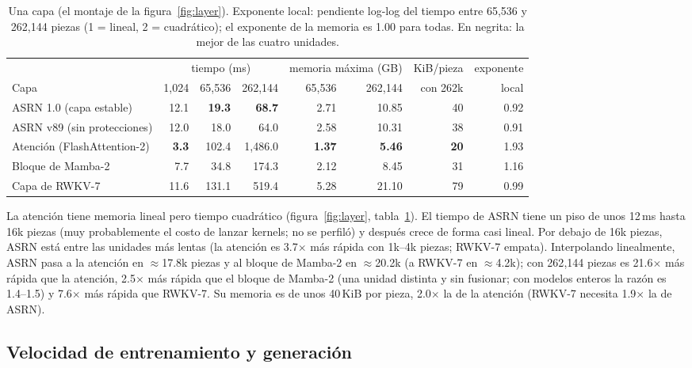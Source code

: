 \documentclass[11pt]{article}
\begin{document}
\begin{table}[t]
\centering\small
\setlength{\tabcolsep}{4.5pt}
\begin{tabular}{lrrrrrrr}
\toprule
& \multicolumn{3}{c}{tiempo (ms)} & \multicolumn{2}{c}{memoria máxima (GB)} & KiB/pieza & exponente \\
\cmidrule(lr){2-4}\cmidrule(lr){5-6}
Capa & 1{,}024 & 65{,}536 & 262{,}144 & 65{,}536 & 262{,}144 & con 262k & local\\
\midrule
ASRN 1.0 (capa estable) & 12.1 & \textbf{19.3} & \textbf{68.7} & 2.71 & 10.85 & 40 & 0.92\\
ASRN v89 (sin protecciones) & 12.0 & 18.0 & 64.0 & 2.58 & 10.31 & 38 & 0.91\\
Atención (FlashAttention-2) & \textbf{3.3} & 102.4 & 1{,}486.0 & \textbf{1.37} & \textbf{5.46} & \textbf{20} & 1.93\\
Bloque de Mamba-2 & 7.7 & 34.8 & 174.3 & 2.12 & 8.45 & 31 & 1.16\\
Capa de RWKV-7 & 11.6 & 131.1 & 519.4 & 5.28 & 21.10 & 79 & 0.99\\
\bottomrule
\end{tabular}
\caption{Una capa (el montaje de la figura~\ref{fig:layer}). Exponente local: pendiente log-log del tiempo entre
65{,}536 y 262{,}144 piezas (1 = lineal, 2 = cuadrático); el exponente de la memoria es 1.00 para todas. En
negrita: la mejor de las cuatro unidades.}
\label{tab:layer}
\end{table}

La atención tiene memoria lineal pero tiempo cuadrático (figura~\ref{fig:layer}, tabla~\ref{tab:layer}). El tiempo de
ASRN tiene un piso de unos 12\,ms hasta 16k piezas (muy probablemente el costo de lanzar kernels; no se perfiló) y
después crece de forma casi lineal. Por debajo de 16k piezas, ASRN está entre las unidades más lentas (la atención es
3.7$\times$ más rápida con 1k--4k piezas; RWKV-7 empata). Interpolando linealmente, ASRN pasa a la atención en
$\approx$17.8k piezas y al bloque de Mamba-2 en $\approx$20.2k (a RWKV-7 en $\approx$4.2k); con 262{,}144 piezas es
21.6$\times$ más rápida que la atención, 2.5$\times$ más rápida que el bloque de Mamba-2 (una unidad distinta y sin
fusionar; con modelos enteros la razón es 1.4--1.5) y 7.6$\times$ más rápida que RWKV-7. Su memoria es de unos 40\,KiB
por pieza, 2.0$\times$ la de la atención (RWKV-7 necesita 1.9$\times$ la de ASRN).

\subsection{Velocidad de entrenamiento y generación}
\label{sec:throughput}
\end{document}
